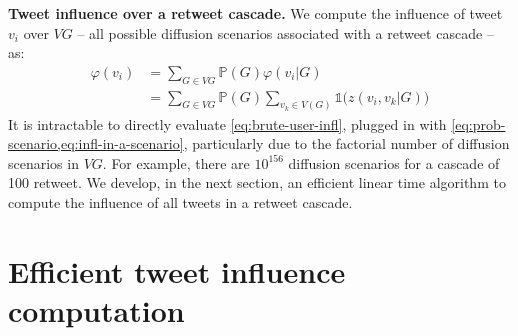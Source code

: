 \textbf{Tweet influence over a retweet cascade.}
We compute the influence of tweet $v_i$ over $VG$ -- all possible diffusion scenarios associated with a retweet cascade -- as:
\begin{align}
	\varphi(v_i) 	&= \sum_{G\in{VG}} \mathds{P}(G) \varphi(v_i|G) \nonumber \\
				&= \sum_{G\in{VG}} \mathds{P}(G) \sum_{v_k \in V(G)} \mathds{1}\big( z(v_i,v_k|G) \big) \label{eq:brute-user-infl}
\end{align}
It is intractable to directly evaluate \cref{eq:brute-user-infl}, plugged in with \cref{eq:prob-scenario,eq:infl-in-a-scenario}, particularly due to the factorial number of diffusion scenarios in $VG$.
For example, there are $10^{156}$ diffusion scenarios for a cascade of 100 retweet.
We develop, in the next section, an efficient linear time algorithm to compute the influence of all tweets in a retweet cascade.

\section{Efficient tweet influence computation}
\label{si-sec:efficient-algo}

